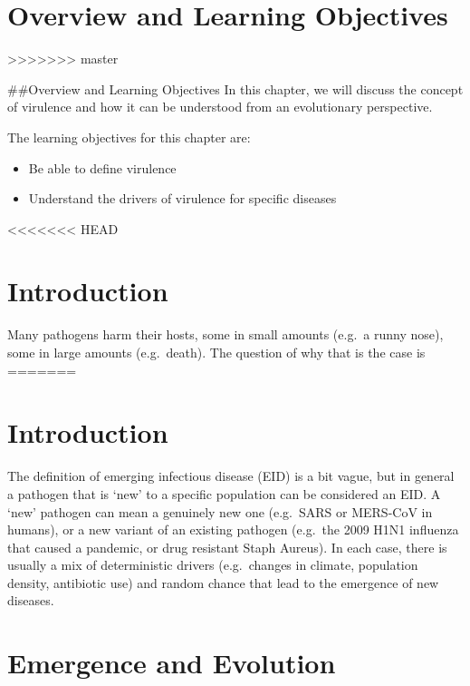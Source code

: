 \documentclass[]{book}
\providecommand{\tightlist}{%
  \setlength{\itemsep}{0pt}\setlength{\parskip}{0pt}}
\theoremstyle{definition}
\theoremstyle{definition}
\theoremstyle{definition}
\theoremstyle{remark}
\begin{document}
\section{Overview and Learning
Objectives}\label{overview-and-learning-objectives-15}
>>>>>>> master

\#\#Overview and Learning Objectives In this chapter, we will discuss
the concept of virulence and how it can be understood from an
evolutionary perspective.

The learning objectives for this chapter are:

\begin{itemize}
\tightlist
\item
  Be able to define virulence
\item
  Understand the drivers of virulence for specific diseases
\end{itemize}

<<<<<<< HEAD
\hypertarget{introduction-10}{%
\section{Introduction}\label{introduction-10}}

Many pathogens harm their hosts, some in small amounts (e.g.~a runny
nose), some in large amounts (e.g.~death). The question of why that is
the case is
=======
\section{Introduction}\label{introduction-15}

The definition of emerging infectious disease (EID) is a bit vague, but
in general a pathogen that is `new' to a specific population can be
considered an EID. A `new' pathogen can mean a genuinely new one
(e.g.~SARS or MERS-CoV in humans), or a new variant of an existing
pathogen (e.g.~the 2009 H1N1 influenza that caused a pandemic, or drug
resistant Staph Aureus). In each case, there is usually a mix of
deterministic drivers (e.g.~changes in climate, population density,
antibiotic use) and random chance that lead to the emergence of new
diseases.

\section{Emergence and Evolution}\label{emergence-and-evolution}
\end{document}
